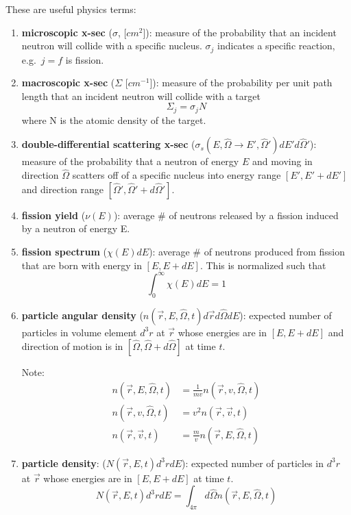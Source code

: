 \documentclass[12pt]{article}
\newcommand{\vOmega}{\ensuremath{\hat{\Omega}}}
\begin{document}
These are useful physics terms:
\begin{enumerate}
\item \textbf{microscopic x-sec} ($\sigma$, [$cm^2$]): measure of the probability that an incident neutron will collide with a specific nucleus. $\sigma_j$ indicates a specific reaction, e.g.\ $j=f$ is fission.

\item \textbf{macroscopic x-sec} ($\Sigma$ [$cm^{-1}$]): measure of the probability per unit path length that an incident neutron will collide with a target
\[\Sigma_j = \sigma_j N\]
where N is the atomic density of the target.

\item \textbf{double-differential scattering x-sec} ($\sigma_s(E, \vOmega \rightarrow E', \vOmega')dE' d\vOmega'$): measure of the probability that a neutron of energy $E$ and moving in direction $\vOmega$ scatters off of a specific nucleus into energy range $[E', E' + dE']$ and direction range $[\vOmega', \vOmega' + d\vOmega']$.

\item \textbf{fission yield} ($\nu(E)$): average \# of neutrons released by a fission induced by a neutron of energy E.

\item \textbf{fission spectrum} ($\chi(E)dE$): average \# of neutrons produced from fission that are born with energy in $[E, E + dE]$. This is normalized such that
\[\int_0^{\infty} \chi(E)dE =1\]


\item \textbf{particle angular density} ($n(\vec{r}, E, \vOmega, t)d\vec{r} d\vOmega dE$): expected number of particles in volume element $d^3r$ at $\vec{r}$ whose energies are in $[E, E + dE]$ and direction of motion is in $[\vOmega, \vOmega + d\vOmega]$ at time $t$.

Note:
\begin{align*}
n(\vec{r}, E, \vOmega, t) &= \frac{1}{mv}n(\vec{r}, v, \vOmega, t) \\
n(\vec{r}, v, \vOmega, t) &= v^2 n(\vec{r}, \vec{v}, t) \\
n(\vec{r}, \vec{v}, t) &= \frac{m}{v}n(\vec{r}, E, \vOmega, t)
\end{align*}

\item \textbf{particle density}: ($N(\vec{r},E,t)d^3r dE$): expected number of particles in $d^3r$ at $\vec{r}$ whose energies are in $[E, E + dE]$ at time $t$.
\[N(\vec{r},E,t)d^3r dE = \int_{4\pi} d\vOmega n(\vec{r}, E, \vOmega, t) \]


\end{enumerate}
\end{document}
